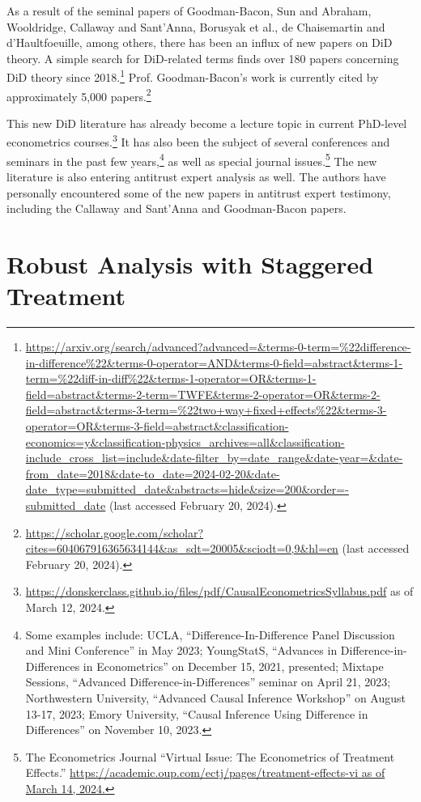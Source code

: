 \documentclass[12pt]{article}
\begin{document}
As a result of the seminal papers of Goodman-Bacon, Sun and Abraham, Wooldridge, Callaway and Sant’Anna, Borusyak et al., de Chaisemartin and d’Haultfoeuille, among others, there has been an influx of new papers on DiD theory. A simple search for DiD-related terms finds over 180 papers concerning DiD theory since 2018.\footnote{\url{https://arxiv.org/search/advanced?advanced=&terms-0-term=\%22difference-in-difference\%22&terms-0-operator=AND&terms-0-field=abstract&terms-1-term=\%22diff-in-diff\%22&terms-1-operator=OR&terms-1-field=abstract&terms-2-term=TWFE&terms-2-operator=OR&terms-2-field=abstract&terms-3-term=\%22two+way+fixed+effects\%22&terms-3-operator=OR&terms-3-field=abstract&classification-economics=y&classification-physics_archives=all&classification-include_cross_list=include&date-filter_by=date_range&date-year=&date-from_date=2018&date-to_date=2024-02-20&date-date_type=submitted_date&abstracts=hide&size=200&order=-submitted_date} (last accessed February 20, 2024).}  Prof. Goodman-Bacon’s work is currently cited by approximately 5,000 papers.\footnote{\url{https://scholar.google.com/scholar?cites=604067916365634144&as_sdt=20005&sciodt=0,9&hl=en} (last accessed February 20, 2024).}

This new DiD literature has already become a lecture topic in current PhD-level econometrics courses.\footnote{\url{https://donskerclass.github.io/files/pdf/CausalEconometricsSyllabus.pdf} as of March 12, 2024.}  It has also been the subject of several conferences and seminars in the past few years,\footnote{Some examples include: UCLA, “Difference-In-Difference Panel Discussion and Mini Conference” in May 2023; YoungStatS, “Advances in Difference-in-Differences in Econometrics” on December 15, 2021, presented; Mixtape Sessions, “Advanced Difference-in-Differences” seminar on April 21, 2023; Northwestern University, “Advanced Causal Inference Workshop” on August 13-17, 2023; Emory University, “Causal Inference Using Difference in Differences” on November 10, 2023.} as well as special journal issues.\footnote{The Econometrics Journal “Virtual Issue: The Econometrics of Treatment Effects.” \url{https://academic.oup.com/ectj/pages/treatment-effects-vi as of March 14, 2024.}} The new literature is also entering antitrust expert analysis as well. The authors have personally encountered some of the new papers in antitrust expert testimony, including the Callaway and Sant’Anna and Goodman-Bacon papers.

\section{Robust Analysis with Staggered Treatment} \label{sec:equations}
\end{document}
